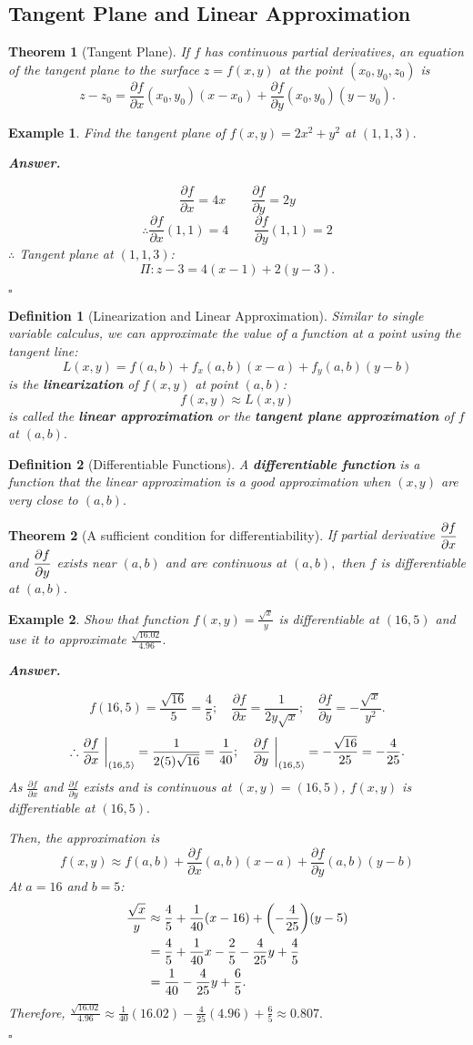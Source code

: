 \documentclass[12pt,a4paper]{article}
\newtheorem{thm}{Theorem}[subsection]
\newtheorem{df}{Definition}[subsection]
\newtheorem{eg}{Example}[subsection]
\newenvironment*{ans}{\par\indent\textbf{\textit{Answer. }}\par}{\par\hfill{$\square$}\par}
\def\dsst{\displaystyle}
\def\del{\partial}
\def\pdfdx{\dsst\frac{\del f}{\del x}}
\def\pdfdy{\dsst\frac{\del f}{\del y}}
\begin{document}
\subsection{Tangent Plane and Linear Approximation}
\begin{thm}[Tangent Plane]
	If $f$ has continuous partial derivatives, an equation of the tangent plane to the surface $z=f(x,y)$ at the point $(x_0,y_0,z_0)$ is \[z-z_0=\pdfdx(x_0,y_0)(x-x_0)+\pdfdy(x_0,y_0)(y-y_0).\]	
\end{thm}
\begin{eg}
	Find the tangent plane of $f(x,y)=2x^2+y^2$ at $(1,1,3).$
	\begin{ans}
		\[\pdfdx=4x\qquad\pdfdy=2y\]
		\[\therefore \pdfdx(1,1)=4\qquad\pdfdy(1,1)=2\]
		$\therefore$ Tangent plane at $(1,1,3)$:\[\Pi: z-3=4(x-1)+2(y-3).\]
	\end{ans}
\end{eg}
\begin{df}[Linearization and Linear Approximation]
	Similar to single variable calculus, we can approximate the value of a function at a point using the tangent line: \[L(x,y)=f(a,b)+f_x(a,b)(x-a)+f_y(a,b)(y-b)\]	is the \textbf{linearization} of $f(x,y)$ at point $(a,b)$: \[f(x,y)\approx L(x,y)\] is called the \textbf{linear approximation} or the \textbf{tangent plane approximation} of $f$ at $(a,b).$
\end{df}
\begin{df}[Differentiable Functions]
	A \textbf{differentiable function} is a function that the linear approximation is a good approximation when $(x,y)$ are very close to $(a,b).$	
\end{df}
\begin{thm}[A sufficient condition for differentiability]
	If partial derivative $\displaystyle\pdfdx$ and $\displaystyle\pdfdy$ exists near $(a,b)$ and are continuous at $(a,b),$ then $f$ is differentiable at $(a,b).$
\end{thm}
\begin{eg}
	Show that function $\displaystyle f(x,y)=\frac{\sqrt{x}}{y}$ is differentiable at $(16,5)$ and use it to approximate $\displaystyle\frac{\sqrt{16.02}}{4.96}.$
	\begin{ans}
		\[f(16,5)=\frac{\sqrt{16}}{5}=\frac{4}{5};\quad\pdfdx=\frac{1}{2y\sqrt{x}};\quad\pdfdy=-\frac{\sqrt{x}}{y^2}.\]\[\therefore\pdfdx\eval{}_{(16,5)}=\frac{1}{2(5)\sqrt{16}}=\frac{1}{40};\quad\pdfdy\eval{}_{(16,5)}=-\frac{\sqrt{16}}{25}=-\frac{4}{25}.\]	As $\pdfdx$ and $\pdfdy$ exists and is continuous at $(x,y)=(16,5)$, $f(x,y)$ is differentiable at $(16,5).$\par Then, the approximation is \[f(x,y)\approx f(a,b)+\pdfdx(a,b)(x-a)+\pdfdy(a,b)(y-b)\] At $a=16$ and $b=5$: \[\begin{aligned}\frac{\sqrt{x}}{y}&\approx\frac{4}{5}+\frac{1}{40}(x-16)+\qty(-\frac{4}{25})(y-5)\\&=\frac{4}{5}+\frac{1}{40}x-\frac{2}{5}-\frac{4}{25}y+\frac{4}{5}\\&=\frac{1}{40}-\frac{4}{25}y+\frac{6}{5}.\end{aligned}\] Therefore, $\displaystyle\frac{\sqrt{16.02}}{4.96}\approx\frac{1}{40}(16.02)-\frac{4}{25}(4.96)+\frac{6}{5}\approx0.807.$
	\end{ans}
\end{eg}
\end{document}
